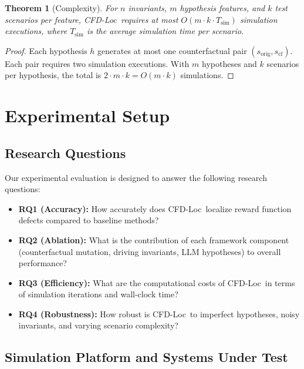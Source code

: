 \documentclass[conference]{IEEEtran}
\theoremstyle{plain}
\newtheorem{theorem}{Theorem}[section]
\newcommand{\methodname}{CFD-Loc}
\begin{document}
\begin{theorem}[Complexity]\label{thm:complexity}
For $n$ invariants, $m$ hypothesis features, and $k$ test scenarios per feature, \methodname\ requires at most $O(m \cdot k \cdot T_{\text{sim}})$ simulation executions, where $T_{\text{sim}}$ is the average simulation time per scenario.
\end{theorem}

\begin{proof}
Each hypothesis $h$ generates at most one counterfactual pair $(s_{\text{orig}}, s_{\text{cf}})$. Each pair requires two simulation executions. With $m$ hypotheses and $k$ scenarios per hypothesis, the total is $2 \cdot m \cdot k = O(m \cdot k)$ simulations.
\end{proof}

\section{Experimental Setup}
\label{sec:experimental}

\subsection{Research Questions}

Our experimental evaluation is designed to answer the following research questions:

\begin{itemize}[nosep]
    \item \textbf{RQ1 (Accuracy):} How accurately does \methodname\ localize reward function defects compared to baseline methods?
    \item \textbf{RQ2 (Ablation):} What is the contribution of each framework component (counterfactual mutation, driving invariants, LLM hypotheses) to overall performance?
    \item \textbf{RQ3 (Efficiency):} What are the computational costs of \methodname\ in terms of simulation iterations and wall-clock time?
    \item \textbf{RQ4 (Robustness):} How robust is \methodname\ to imperfect hypotheses, noisy invariants, and varying scenario complexity?
\end{itemize}

\subsection{Simulation Platform and Systems Under Test}
\end{document}
